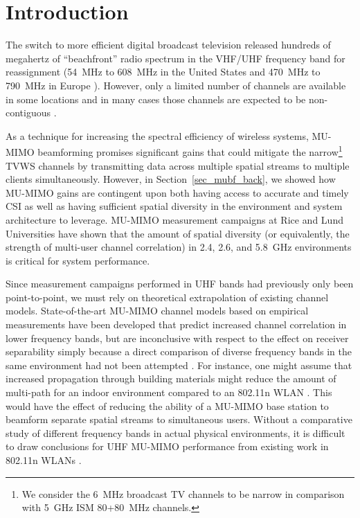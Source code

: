 
\section{Introduction}
\label{sec_environment_chapter}

	The switch to more efficient digital broadcast television released hundreds of megahertz of ``beachfront'' radio spectrum in the VHF/UHF frequency band for reassignment (54~MHz to 608~MHz in the United States and 470~MHz to 790~MHz in Europe \cite{fcc2010second, fcc2015ro, ofcom2012tvws}).
	However, only a limited number of channels are available in some locations and in many cases those channels are expected to be non-contiguous \cite{mishra2009much}.

	As a technique for increasing the spectral efficiency of wireless systems, \acf{MU-MIMO} beamforming promises significant gains that could mitigate the narrow\footnote{We consider the 6~MHz broadcast TV channels to be narrow in comparison with 5~GHz \ac{ISM} 80+80~MHz channels.} \ac{TVWS} channels by transmitting data across multiple spatial streams to multiple clients simultaneously.
	However, in Section~\ref{sec_mubf_back}, we showed how \ac{MU-MIMO} gains are contingent upon both having access to accurate and timely \ac{CSI} as well as having sufficient spatial diversity in the environment and system architecture to leverage.
	\ac{MU-MIMO} measurement campaigns at Rice \cite{aryafar2010design, anandpuma} and Lund \cite{kolmonen2010measurement, flordelis2015spatial} Universities have shown that the amount of spatial diversity (or equivalently, the strength of multi-user channel correlation) in 2.4, 2.6, and 5.8~GHz environments is critical for system performance.
	
	Since measurement campaigns performed in UHF bands had previously only been point-to-point, we must rely on theoretical extrapolation of existing channel models.
	State-of-the-art \ac{MU-MIMO} channel models based on empirical measurements have been developed that predict increased channel correlation in lower frequency bands, but are inconclusive with respect to the effect on receiver separability simply because a direct comparison of diverse frequency bands in the same environment had not been attempted \cite{poutanen2011cost, zhu2013cost}.
	For instance, one might assume that increased propagation through building materials might reduce the amount of multi-path for an indoor environment compared to an 802.11n WLAN \cite{flores2013ieee80211af}.
	This would have the effect of reducing the ability of a MU-MIMO base station to beamform separate spatial streams to simultaneous users.
Without a comparative study of different frequency bands in actual physical environments, it is difficult to draw conclusions for UHF MU-MIMO performance from existing work in 802.11n WLANs \cite{aryafar2010design}.

